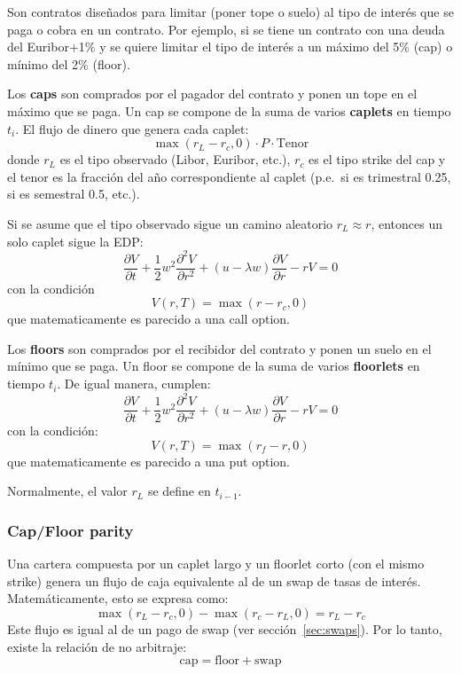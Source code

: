 Son contratos diseñados para limitar (poner tope o suelo) al tipo de interés que se paga o cobra en un contrato. Por ejemplo, si se tiene un contrato con una deuda del Euribor+1\% y se quiere limitar el tipo de interés a un máximo del 5\% (cap) o mínimo del 2\% (floor).

Los \textbf{caps} son comprados por el pagador del contrato y ponen un tope en el máximo que se paga. Un cap se compone de la suma de varios \textbf{caplets} en tiempo $t_i$. El flujo de dinero que genera cada caplet:
\begin{equation*}
    \boxed{\max(r_L-r_c, 0) \cdot P \cdot \text{Tenor}}
\end{equation*}
donde $r_L$ es el tipo observado (Libor, Euribor, etc.), $r_c$ es el tipo strike del cap y el tenor es la fracción del año correspondiente al caplet (p.e.\ si es trimestral 0.25, si es semestral 0.5, etc.). 

Si se asume que el tipo observado sigue un camino aleatorio $r_L \approx r$, entonces un solo caplet sigue la EDP:
\begin{equation*}
    \boxed{\frac{\partial V}{\partial t} + \frac{1}{2} w^2 \frac{\partial^2 V}{\partial r^2} + (u - \lambda w) \frac{\partial V}{\partial r} - rV = 0}
\end{equation*}
con la condición
\begin{equation*}
    \boxed{V(r,T) = \max(r - r_c, 0)}
\end{equation*}
que matematicamente es parecido a una call option.



Los \textbf{floors} son comprados por el recibidor del contrato y ponen un suelo en el mínimo que se paga. Un floor se compone de la suma de varios \textbf{floorlets} en tiempo $t_i$. De igual manera, cumplen:
\begin{equation*}
    \boxed{\frac{\partial V}{\partial t} + \frac{1}{2} w^2 \frac{\partial^2 V}{\partial r^2} + (u - \lambda w) \frac{\partial V}{\partial r} - rV = 0}
\end{equation*}
con la condición:
\begin{equation*}
    \boxed{V(r,T) = \max(r_f - r, 0)}
\end{equation*}
que matematicamente es parecido a una put option.


Normalmente, el valor $r_L$ se define en $t_{i-1}$.


\subsubsection{Cap/Floor parity}
Una cartera compuesta por un caplet largo y un floorlet corto (con el mismo strike) genera un flujo de caja equivalente al de un swap de tasas de interés. Matemáticamente, esto se expresa como:
\begin{equation*}
    \max(r_L - r_c, 0) - \max(r_c - r_L, 0) = r_L - r_c
\end{equation*}
Este flujo es igual al de un pago de swap (ver sección~\ref{sec:swaps}). Por lo tanto, existe la relación de no arbitraje:
\begin{equation*}
    \boxed{\text{cap} = \text{floor} + \text{swap}}
\end{equation*}



